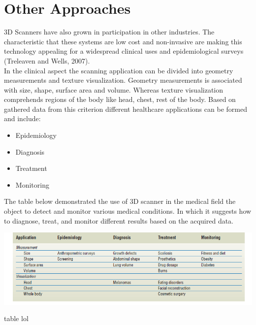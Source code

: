 \documentclass[a4paper]{article}
\begin{document}
 \section*{Other Approaches}
 3D Scanners have also grown in participation in other industries. The  characteristic that these systems are low cost and non-invasive are making this technology  appealing for a widespread clinical uses and epidemiological surveys (Treleaven and Wells, 2007).\\[10pt]
 In the clinical aspect the scanning application can be divided into geometry measurements and texture visualization. 
 Geometry measurements is associated with size, shape, surface area and volume. Whereas texture visualization comprehends regions of the body like head, chest, rest of the body.
 Based on gathered data from this criterion different healthcare applications can be formed and include: 
\begin{itemize}[]
    \itemsep0em 
    \item Epidemiology
    \item Diagnosis
    \item Treatment
    \item Monitoring
\end{itemize}
The table below demonstrated the use of 3D scanner in the medical field the object to detect and monitor various medical conditions. In which it suggests how to diagnose, treat, and monitor different results based on the acquired data.
\begin{table}[ht]
    \centering
    \includegraphics[width=17cm]{table1.png}
    \caption{table lol}
\end{table}
\end{document}
